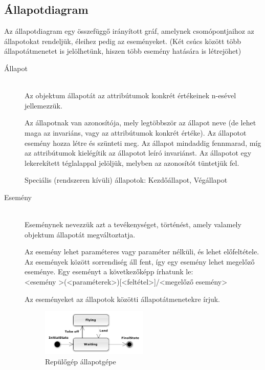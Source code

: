 \documentclass[margin=0px]{article}
\begin{document}
\subsection{Állapotdiagram}
Az állapotdiagram egy összefüggő irányított gráf, amelynek csomópontjaihoz az állapotokat rendeljük, éleihez pedig az eseményeket. (Két csúcs között több állapotátmenetet is jelölhetünk, hiszen több esemény hatására is létrejöhet)
\begin{description}
    \item[Állapot] \hfill \\
        Az objektum állapotát az attribútumok konkrét értékeinek n-esével jellemezzük.

        Az állapotnak van azonosítója, mely legtöbbször az állapot neve (de lehet maga az invariáns, vagy az attribútumok konkrét értéke). Az állapotot esemény hozza létre és szünteti meg. Az állapot mindaddig fennmarad, míg az attribútumok kielégítik az állapotot leíró invariánst. Az állapotot egy lekerekített téglalappal jelöljük, melyben az azonosítót tüntetjük fel.

        Speciális (rendszeren kívüli) állapotok: Kezdőállapot, Végállapot
    \item[Esemény] \hfill \\
        Eseménynek nevezzük azt a tevékenységet, történést, amely valamely objektum állapotát megváltoztatja.

        Az esemény lehet paraméteres vagy paraméter nélküli, és lehet előfeltétele. Az események között sorrendiség áll fent, így egy esemény lehet megelőző eseménye. Egy eseményt a következőképp írhatunk le:\\
        \textless esemény \textgreater (\textless paraméterek\textgreater)[\textless feltétel\textgreater]/\textless megelőző esemény\textgreater

        Az eseményeket az állapotok közötti állapotátmenetekre írjuk.
        \begin{figure}[H]
            \centering
            \includegraphics[width=0.5\textwidth]{img/plane.png}
            \caption{Repülőgép állapotgépe}
        \end{figure}
\end{description}
\end{document}
